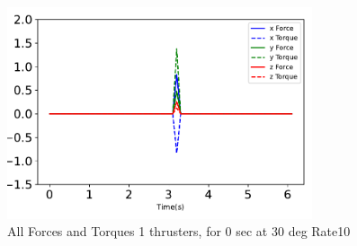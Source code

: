 \begin{figure}[htbp]\centerline{\includegraphics[width=0.8\textwidth]{AutoTeX/1Thrusters_0s_30deg_Loc2_Rate10}}\caption{All Forces and Torques 1 thrusters, for 0 sec at 30 deg Rate10}\label{fig:1Thrusters_0s_30deg_Loc2_Rate10}\end{figure}